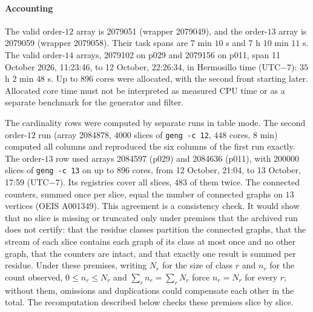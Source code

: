 \paragraph{Accounting}
The valid order-$12$ array is 2079051 (wrapper 2079049), and the order-$13$ array is 2079059 (wrapper 2079058). Their task spans are $7$ min $10$ s and $7$ h $10$ min $11$ s. The valid order-$14$ arrays, 2079102 on p029 and 2079156 on p011, span 11 October 2026, 11:23:46, to 12 October, 22:26:34, in Hermosillo time (UTC$-7$): $35$ h $2$ min $48$ s. Up to $896$ cores were allocated, with the second front starting later. Allocated core time must not be interpreted as measured CPU time or as a separate benchmark for the generator and filter.

The cardinality rows were computed by separate runs in table mode. The second order-$12$ run (array 2084878, $\num{4000}$ slices of \texttt{geng -c 12}, $448$ cores, $8$ min) computed all columns and reproduced the six columns of the first run exactly. The order-$13$ row used arrays 2084597 (p029) and 2084636 (p011), with $\num{200000}$ slices of \texttt{geng -c 13} on up to $896$ cores, from 12 October, 21:04, to 13 October, 17:59 (UTC$-7$). Its registries cover all slices, $483$ of them twice. The connected counters, summed once per slice, equal the number of connected graphs on $13$ vertices (OEIS A001349). This agreement is a consistency check. It would show that no slice is missing or truncated only under premises that the archived run does not certify: that the residue classes partition the connected graphs, that the stream of each slice contains each graph of its class at most once and no other graph, that the counters are intact, and that exactly one result is summed per residue. Under these premises, writing $N_r$ for the size of class $r$ and $n_r$ for the count observed, $0\le n_r\le N_r$ and $\sum_r n_r=\sum_r N_r$ force $n_r=N_r$ for every $r$; without them, omissions and duplications could compensate each other in the total. The recomputation described below checks these premises slice by slice.

